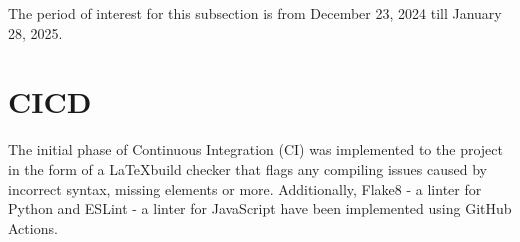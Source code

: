 \documentclass{article}
\begin{document}
The period of interest for this subsection is from December 23, 2024 till January 28, 2025.

\section{CICD}

The initial phase of Continuous Integration (CI) was implemented to the project in the form 
of a \LaTeX build checker that flags any compiling issues caused by incorrect syntax, missing 
elements or more. Additionally, Flake8 - a linter for Python and ESLint - a linter for JavaScript have been
implemented using GitHub Actions.
\end{document}
